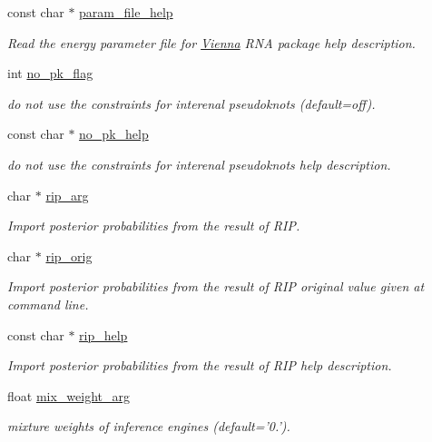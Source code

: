 \begin{DoxyCompactItemize}
const char $\ast$ \hyperlink{structgengetopt__args__info_a9f45df949ae710b164262b66c4982498}{param\+\_\+file\+\_\+help}
\begin{DoxyCompactList}\small\item\em Read the energy parameter file for \hyperlink{namespace_vienna}{Vienna} R\+N\+A package help description. \end{DoxyCompactList}\item 
int \hyperlink{structgengetopt__args__info_a656b35ad9dd3f8f39444ec2684fcf47c}{no\+\_\+pk\+\_\+flag}
\begin{DoxyCompactList}\small\item\em do not use the constraints for interenal pseudoknots (default=off). \end{DoxyCompactList}\item 
const char $\ast$ \hyperlink{structgengetopt__args__info_ab2409525071e5bcc073637b7e252fea8}{no\+\_\+pk\+\_\+help}
\begin{DoxyCompactList}\small\item\em do not use the constraints for interenal pseudoknots help description. \end{DoxyCompactList}\item 
char $\ast$ \hyperlink{structgengetopt__args__info_aa613330dba372001de2dfa178b161a1a}{rip\+\_\+arg}
\begin{DoxyCompactList}\small\item\em Import posterior probabilities from the result of R\+I\+P. \end{DoxyCompactList}\item 
char $\ast$ \hyperlink{structgengetopt__args__info_a152b3fd65570a82ac6effec4c8f78317}{rip\+\_\+orig}
\begin{DoxyCompactList}\small\item\em Import posterior probabilities from the result of R\+I\+P original value given at command line. \end{DoxyCompactList}\item 
const char $\ast$ \hyperlink{structgengetopt__args__info_a41b61f6fe469c862d765c45879591857}{rip\+\_\+help}
\begin{DoxyCompactList}\small\item\em Import posterior probabilities from the result of R\+I\+P help description. \end{DoxyCompactList}\item 
float \hyperlink{structgengetopt__args__info_a5453c7d90806e2c130485e8d45e4b2bb}{mix\+\_\+weight\+\_\+arg}
\begin{DoxyCompactList}\small\item\em mixture weights of inference engines (default='0.'). \end{DoxyCompactList}\item 

\end{DoxyCompactItemize}
